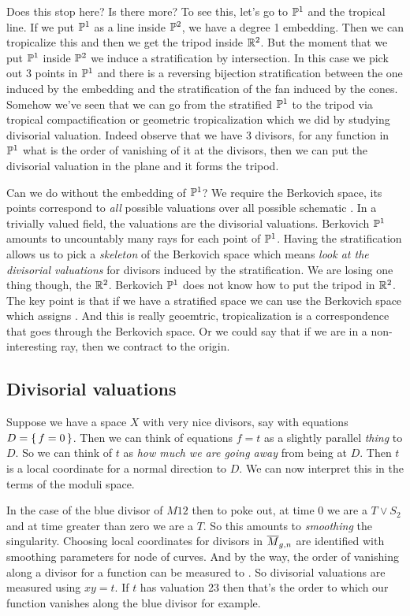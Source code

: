 \documentclass[12pt]{memoir}
\begin{document}
Does this stop here? Is there more? To see this, let's go to $\mathbb{P}^1$ and the tropical line. If we put $\mathbb{P}^1$ as a line inside $\mathbb{P}^2$, we have a degree 1 embedding. Then we can tropicalize this and then we get the tripod inside $\mathbb{R}^2$. But the moment that we put $\mathbb{P}^1$ inside $\mathbb{P}^2$ we induce a stratification by intersection. In this case we pick out 3 points in $\mathbb{P}^1$ and there is a reversing bijection stratification between the one induced by the embedding and the stratification of the fan induced by the cones. Somehow we've seen that we can go from the stratified $\mathbb{P}^1$ to the tripod via tropical compactification or geometric tropicalization which we did by studying divisorial valuation. Indeed observe that we have 3 divisors, for any function in $\mathbb{P}^1$ what is the order of vanishing of it at the divisors, then we can put the divisorial valuation in the plane and it forms the tripod.\par 
Can we do without the embedding of $\mathbb{P}^1$? We require the Berkovich space, its points correspond to \emph{all} possible valuations over all possible schematic . In a trivially valued field, the valuations are the divisorial valuations. Berkovich $\mathbb{P}^1$ amounts to uncountably many rays for each point of $\mathbb{P}^1$. Having the stratification allows us to pick a \emph{skeleton} of the Berkovich space which means \emph{look at the divisorial valuations} for divisors induced by the stratification. We are losing one thing though, the $\mathbb{R}^2$. Berkovich $\mathbb{P}^1$ does not know how to put the tripod in $\mathbb{R}^2$. The key point is that if we have a stratified space we can use the Berkovich space which assigns . And this is really geoemtric, tropicalization is a correspondence that goes through the Berkovich space. Or we could say that if we are in a non-interesting ray, then we contract to the origin.

\subsection{Divisorial valuations}

Suppose we have a space $X$ with very nice divisors, say with equations $D=\{\,f=0\,\}$. Then we can think of equations $f=t$ as a slightly parallel \emph{thing} to $D$. So we can think of $t$ as \emph{how much we are going away} from being at $D$. Then $t$ is a local coordinate for a normal direction to $D$. We can now interpret this in the terms of the moduli space. 

\begin{Ex}
    In the case of the blue divisor of $M12$ then to poke out, at time $0$ we are a $T\lor S_2$ and at time greater than zero we are a $T$. So this amounts to \emph{smoothing} the singularity. Choosing local coordinates for divisors in $\overline M_{g,n}$ are identified with smoothing parameters for node of curves. And by the way, the order of vanishing along a divisor for a function can be measured to . So divisorial valuations are measured using $xy=t$. If $t$ has valuation 23 then that's the order to which our function vanishes along the blue divisor for example.
\end{Ex}
\end{document}
